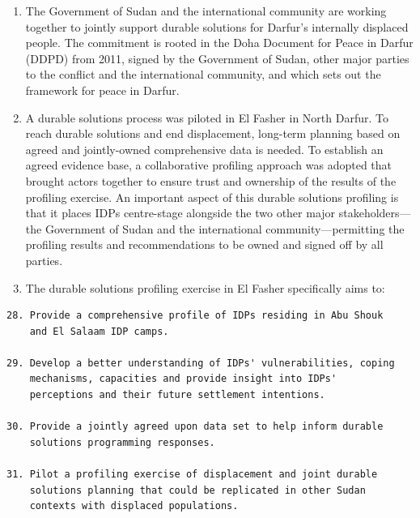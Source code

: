 \documentclass[
]{article}
\begin{document}
\begin{enumerate}
\def\labelenumi{\arabic{enumi}.}
\setcounter{enumi}{443}
\item
  The Government of Sudan and the international community are working
  together to jointly support durable solutions for Darfur's
  internally displaced people. The commitment is rooted in the Doha
  Document for Peace in Darfur (DDPD) from 2011, signed by the
  Government of Sudan, other major parties to the conflict and the
  international community, and which sets out the framework for peace
  in Darfur.
\item
  A durable solutions process was piloted in El Fasher in North
  Darfur. To reach durable solutions and end displacement, long-term
  planning based on agreed and jointly-owned comprehensive data is
  needed. To establish an agreed evidence base, a collaborative
  profiling approach was adopted that brought actors together to
  ensure trust and ownership of the results of the profiling exercise.
  An important aspect of this durable solutions profiling is that it
  places IDPs centre-stage alongside the two other major
  stakeholders---the Government of Sudan and the international
  community---permitting the profiling results and recommendations to
  be owned and signed off by all parties.
\item
  The durable solutions profiling exercise in El Fasher specifically
  aims to:
\end{enumerate}

\begin{verbatim}
28. Provide a comprehensive profile of IDPs residing in Abu Shouk
    and El Salaam IDP camps.

29. Develop a better understanding of IDPs' vulnerabilities, coping
    mechanisms, capacities and provide insight into IDPs'
    perceptions and their future settlement intentions.

30. Provide a jointly agreed upon data set to help inform durable
    solutions programming responses.

31. Pilot a profiling exercise of displacement and joint durable
    solutions planning that could be replicated in other Sudan
    contexts with displaced populations.
\end{verbatim}
\end{document}
